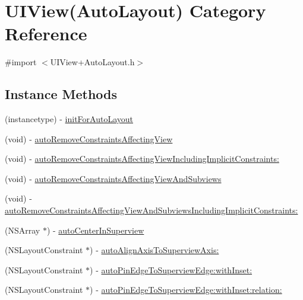 \hypertarget{category_u_i_view_07_auto_layout_08}{}\section{U\+I\+View(Auto\+Layout) Category Reference}
\label{category_u_i_view_07_auto_layout_08}


{\ttfamily \#import $<$U\+I\+View+\+Auto\+Layout.\+h$>$}

\subsection*{Instance Methods}
\begin{DoxyCompactItemize}
\item 
(instancetype) -\/ \mbox{\hyperlink{category_u_i_view_07_auto_layout_08_a84269e054fbe2d33e63618980f1a85ee}{init\+For\+Auto\+Layout}}
\item 
(void) -\/ \mbox{\hyperlink{category_u_i_view_07_auto_layout_08_ac0578df2fe05c1ae5170f286a18026e2}{auto\+Remove\+Constraints\+Affecting\+View}}
\item 
(void) -\/ \mbox{\hyperlink{category_u_i_view_07_auto_layout_08_a8ef3d82eac5c95945a96b6cca523484f}{auto\+Remove\+Constraints\+Affecting\+View\+Including\+Implicit\+Constraints\+:}}
\item 
(void) -\/ \mbox{\hyperlink{category_u_i_view_07_auto_layout_08_a535a5949342ded134320b284ad29928b}{auto\+Remove\+Constraints\+Affecting\+View\+And\+Subviews}}
\item 
(void) -\/ \mbox{\hyperlink{category_u_i_view_07_auto_layout_08_a29d693df00cbc559a033f68e90fc58f1}{auto\+Remove\+Constraints\+Affecting\+View\+And\+Subviews\+Including\+Implicit\+Constraints\+:}}
\item 
(N\+S\+Array $\ast$) -\/ \mbox{\hyperlink{category_u_i_view_07_auto_layout_08_adaa4cc1dd278309619527bcb9c79de5e}{auto\+Center\+In\+Superview}}
\item 
(N\+S\+Layout\+Constraint $\ast$) -\/ \mbox{\hyperlink{category_u_i_view_07_auto_layout_08_aaea5cc2847806b8c551998340ad050fc}{auto\+Align\+Axis\+To\+Superview\+Axis\+:}}
\item 
(N\+S\+Layout\+Constraint $\ast$) -\/ \mbox{\hyperlink{category_u_i_view_07_auto_layout_08_a4c12119f7685e0f333ba70a38f6facd7}{auto\+Pin\+Edge\+To\+Superview\+Edge\+:with\+Inset\+:}}
\item 
(N\+S\+Layout\+Constraint $\ast$) -\/ \mbox{\hyperlink{category_u_i_view_07_auto_layout_08_ae6859ea6905a3432b9efc0090fb027c7}{auto\+Pin\+Edge\+To\+Superview\+Edge\+:with\+Inset\+:relation\+:}}

\end{DoxyCompactItemize}

